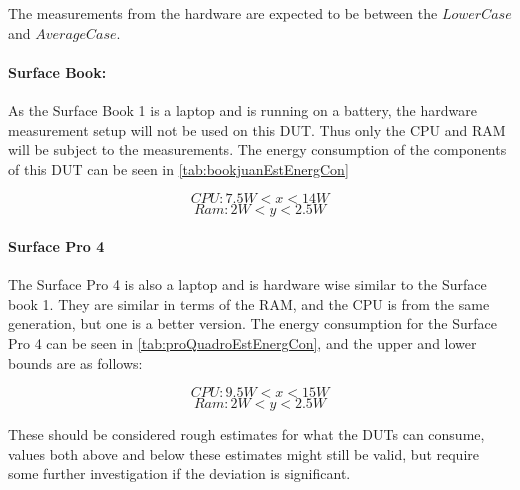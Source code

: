The measurements from the hardware are expected to be between the $LowerCase$ and $AverageCase$.

\paragraph{Surface Book:} As the Surface Book 1 is a laptop and is running on a battery, the hardware measurement setup will not be used on this DUT. Thus only the CPU and RAM will be subject to the measurements. The energy consumption of the components of this DUT can be seen in \cref*{tab:bookjuanEstEnergCon}

$$CPU: 7.5W < x < 14W $$
$$Ram: 2W < y < 2.5W $$



\paragraph{Surface Pro 4} The Surface Pro 4 is also a laptop and is hardware wise similar to the Surface book 1. They are similar in terms of the RAM, and the CPU is from the same generation, but one is a better version. The energy consumption for the Surface Pro 4 can be seen in \cref{tab:proQuadroEstEnergCon}, and the upper and lower bounds are as follows:

$$CPU: 9.5W < x < 15W $$
$$Ram: 2W < y < 2.5W $$



These should be considered rough estimates for what the DUTs can consume, values both above and below these estimates might still be valid, but require some further investigation if the deviation is significant.